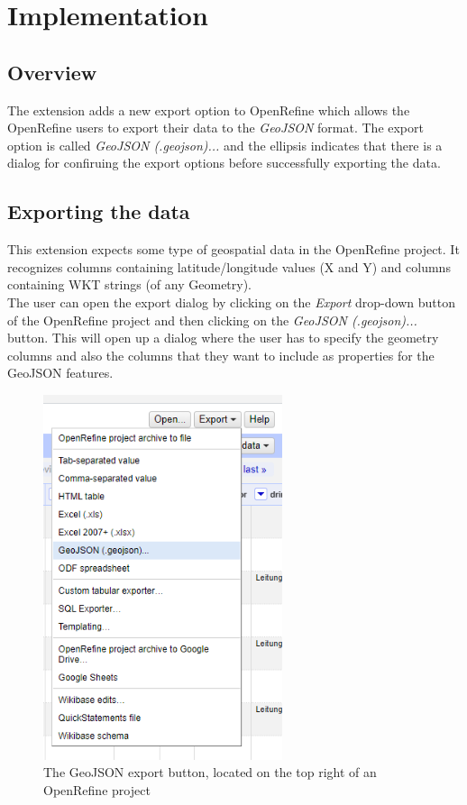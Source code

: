 \section{Implementation}
\subsection{Overview}
The extension adds a new export option to OpenRefine which allows the OpenRefine users to
export their data to the \textit{GeoJSON} format. The export option is called \textit{GeoJSON (.geojson)...} and the ellipsis
indicates that there is a dialog for confiruing the export options before successfully exporting the data.
\subsection{Exporting the data}
This extension expects some type of geospatial data in the OpenRefine project.
It recognizes columns containing latitude/longitude values (X and Y) and columns containing WKT strings (of any Geometry).\\
\newline
The user can open the export dialog by clicking on the \textit{Export} drop-down button of the OpenRefine project and then clicking
on the \textit{GeoJSON (.geojson)...} button.
This will open up a dialog where the user has to specify the geometry columns and also the columns that they want to
include as properties for the GeoJSON features.\\
\newline

\begin{figure}[H]
    \includegraphics[width=7cm]{./Figures/GeoJSON_Export/geojson_export_button}
    \caption{The GeoJSON export button, located on the top right of an OpenRefine project}
\end{figure}


